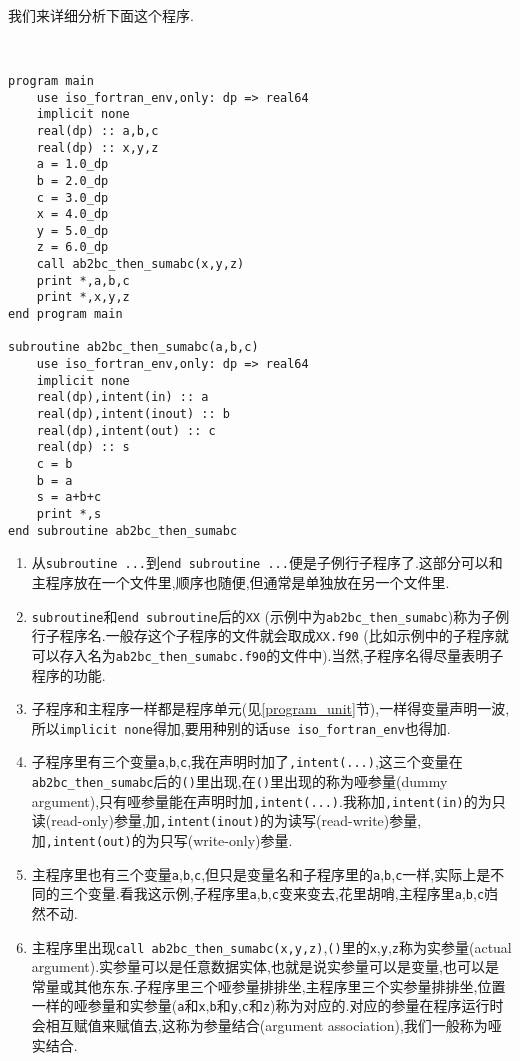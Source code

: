 我们来详细分析下面这个程序.
\begin{lstlisting}


program main
    use iso_fortran_env,only: dp => real64
    implicit none
    real(dp) :: a,b,c
    real(dp) :: x,y,z
    a = 1.0_dp
    b = 2.0_dp
    c = 3.0_dp
    x = 4.0_dp
    y = 5.0_dp
    z = 6.0_dp
    call ab2bc_then_sumabc(x,y,z)
    print *,a,b,c
    print *,x,y,z
end program main

subroutine ab2bc_then_sumabc(a,b,c)
    use iso_fortran_env,only: dp => real64
    implicit none
    real(dp),intent(in) :: a
    real(dp),intent(inout) :: b
    real(dp),intent(out) :: c
    real(dp) :: s
    c = b
    b = a
    s = a+b+c
    print *,s
end subroutine ab2bc_then_sumabc
\end{lstlisting}
\begin{enumerate}
    \item 从\texttt{subroutine ...}到\texttt{end subroutine ...}便是子例行子程序了.这部分可以和主程序放在一个文件里,顺序也随便,但通常是单独放在另一个文件里.
    \item \texttt{subroutine}和\texttt{end subroutine}后的\texttt{XX} (示例中为\texttt{ab2bc\_{}then\_{}sumabc})称为子例行子程序名.一般存这个子程序的文件就会取成\texttt{XX.f90} (比如示例中的子程序就可以存入名为\texttt{ab2bc\_{}then\_{}sumabc.f90}的文件中).当然,子程序名得尽量表明子程序的功能.
    \item 子程序和主程序一样都是程序单元(见\ref{program_unit}节),一样得变量声明一波,所以\texttt{implicit none}得加,要用种别的话\texttt{use iso\_{}fortran\_{}env}也得加.
    \item 子程序里有三个变量\texttt{a},\texttt{b},\texttt{c},我在声明时加了\texttt{,intent(...)},这三个变量在\texttt{ab2bc\_{}then\_{}sumabc}后的\texttt{()}里出现,在\texttt{()}里出现的称为哑参量(dummy argument),只有哑参量能在声明时加\texttt{,intent(...)}.我称加\texttt{,intent(in)}的为只读(read-only)参量,加\texttt{,intent(inout)}的为读写(read-write)参量,加\texttt{,intent(out)}的为只写(write-only)参量.
    \item 主程序里也有三个变量\texttt{a},\texttt{b},\texttt{c},但只是变量名和子程序里的\texttt{a},\texttt{b},\texttt{c}一样,实际上是不同的三个变量.看我这示例,子程序里\texttt{a},\texttt{b},\texttt{c}变来变去,花里胡哨,主程序里\texttt{a},\texttt{b},\texttt{c}岿然不动.
    \item 主程序里出现\texttt{call ab2bc\_{}then\_{}sumabc(x,y,z)},\texttt{()}里的\texttt{x},\texttt{y},\texttt{z}称为实参量(actual argument).实参量可以是任意数据实体,也就是说实参量可以是变量,也可以是常量或其他东东.子程序里三个哑参量排排坐,主程序里三个实参量排排坐,位置一样的哑参量和实参量(\texttt{a}和\texttt{x},\texttt{b}和\texttt{y},\texttt{c}和\texttt{z})称为对应的.对应的参量在程序运行时会相互赋值来赋值去,这称为参量结合(argument association),我们一般称为哑实结合.

\end{enumerate}
